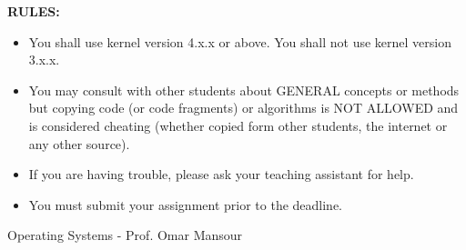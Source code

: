 \documentclass{article}
\begin{document}
\textbf{RULES:}
\begin{itemize}
    \item You shall use kernel version 4.x.x or above. You shall not use kernel version 3.x.x.
    \item You may consult with other students about GENERAL concepts or methods but copying code (or code fragments) or algorithms is NOT ALLOWED and is considered cheating (whether copied form other students, the internet or any other source).
    \item If you are having trouble, please ask your teaching assistant for help.
    \item You must submit your assignment prior to the deadline.
\end{itemize}

Operating Systems - Prof. Omar Mansour
\end{document}
